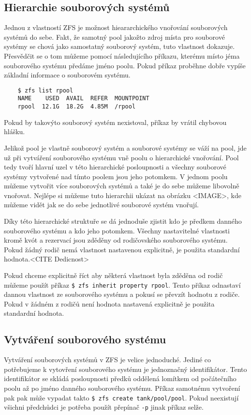     \subsection{Hierarchie souborových systémů}
    \label{hiararchy}
    Jednou z vlastností ZFS je možnost hieararchického vnořování souborových systémů do sebe. Fakt, že samotný pool jakožto zdroj místa pro souborové systémy se chová jako samostatný souborový systém, tuto vlastnost dokazuje. Přesvědčit se o tom můžeme pomocí následujícího příkazu, kterému místo jéma souborového systému předáme jméno poolu. Pokud příkaz proběhne dobře vypíše základní informace o souborovém systému.
    \begin{verbatim}
    $ zfs list rpool
    NAME    USED  AVAIL  REFER  MOUNTPOINT
    rpool  12.1G  18.2G  4.85M  /rpool
    \end{verbatim}
    Pokud by takovýto souborový systém nexistoval, příkaz by vrátil chybovou hlášku. 
    
    Jelikož pool je vlastně souborový systém a souborové systémy se váží na pool, jde už při vytváření souborového systému vně poolu o hierarchické vnořování. Pool tedy tvoří hlavní uzel v této hierarchické posloupnosti a všechny souborové systémy vytvořené nad tímto poolem jsou jeho potomkem. V jednom poolu můžeme vytvořit více souborových systémů a také je do sebe můžeme libovolně vnořovat. Nejlépe si můžeme tuto hierarchii ukázat na obrázku <IMAGE>, kde můžeme vidět jak se do sebe jednotlivé souborové systém vnořují.
    
    Díky této hierarchické struktuře se dá jednoduše zjistit kdo je předkem danného souborového systému a kdo jeho potomkem. Všechny nastavitelné vlastnosti kromě kvót a rezervací jsou zděděny od rodičovského souborového systému. Pokud žádný rodič nemá vlastnost nastavenou explicitně, je použita standardní hodnota.<CITE Dedicnost>
    
    Pokud chceme explicitně říct aby některá vlastnost byla zděděna od rodič můžeme použít příkaz \verb|$ zfs inherit property rpool|. Tento příkaz odnastaví dannou vlastnost ze souborového systému a pokusí se převzít hodnotu z rodiče. Pokud v žádném z rodičů není hodnota nastavená explicitně je použita standardní hodnota.
    \subsection{Vytváření souborového systému}        
    \label{createfs}
    Vytváření souborových systémů v ZFS je velice jednoduché. Jediné co potřebujeme k vytovření souborového systému je jednoznačný identifikátor. Tento identifikátor se skládá posloupnosti předků oddělená lomítkem od počátečního poolu až po jméno danného souborového systému. Příkaz samotnému vytvoření pak pak může vypadat takto \verb|$ zfs create tank/pool/pool|. Pokud neexistují všichni předchůdci je potřeba použít přepínač \verb|-p| jinak příkaz selže.
    
